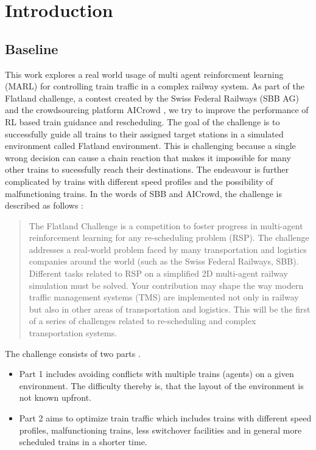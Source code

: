 \chapter{Introduction}\label{chap.einleitung}
\section{Baseline}\label{baseline}
This work explores a real world usage of multi agent reinforcment learning (MARL) for controlling train traffic in a complex railway system.
As part of the Flatland challenge, a contest created by the Swiss Federal Railways (SBB AG) and the crowdsourcing platform AICrowd \cite{aicrowd}, we try to improve the performance of RL based train guidance and rescheduling. The goal of the challenge is to successfully guide all trains to their assigned target stations in a simulated environment called Flatland environment.
This is challenging because a single wrong decision can cause a chain reaction that makes it impossible for many other trains to sucessfully reach their destinations. The endeavour is further complicated by trains with different speed profiles and the possibility of malfunctioning trains. In the words of SBB and AICrowd, the challenge is described as follows \cite{aicrowd}:
\begin{quote}
	The Flatland Challenge is a competition to foster progress in multi-agent reinforcement learning for any re-scheduling problem (RSP). The challenge addresses a real-world problem faced by many transportation and logistics companies around the world (such as the Swiss Federal Railways, SBB). Different tasks related to RSP on a simplified 2D multi-agent railway simulation must be solved. Your contribution may shape the way modern traffic management systems (TMS) are implemented not only in railway but also in other areas of transportation and logistics. This will be the first of a series of challenges related to re-scheduling and complex transportation systems.
\end{quote}
The challenge consists of two parts \cite{aicrowd}.  
\begin{itemize}
	\item Part 1 includes avoiding conflicts with multiple trains (agents) on a given environment. The difficulty thereby is, that the layout of the environment is not known upfront.
	\item Part 2 aims to optimize train traffic which includes trains with different speed profiles, malfunctioning trains, less switchover facilities and in general more scheduled trains in a shorter time.
\end{itemize}
